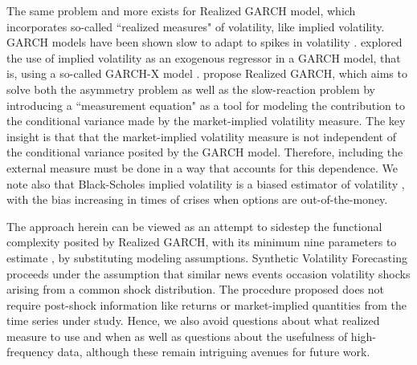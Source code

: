 \documentclass[11pt]{article}
\theoremstyle{definition}
\begin{document}
The same problem and more exists for Realized GARCH model, which incorporates so-called ``realized measures" of volatility, like implied volatility.  GARCH models have been shown slow to adapt to spikes in volatility \citep{andersen2003modeling}.  \citet{engle2002new} explored the use of implied volatility as an exogenous regressor in a GARCH model, that is, using a so-called GARCH-X model \citep{RePEc:pra:mprapa:100301}. \citet{hansen2012realized} propose Realized GARCH, which aims to solve both the asymmetry problem as well as the slow-reaction problem by introducing a ``measurement equation" as a tool for modeling the contribution to the conditional variance made by the market-implied volatility measure.  The key insight is that that the market-implied volatility measure is not independent of the conditional variance posited by the GARCH model.  Therefore, including the external measure must be done in a way that accounts for this dependence.  We note also that Black-Scholes implied volatility is a biased estimator of volatility \citep{mayhew1995implied, christensen1998relation}, with the bias increasing in times of crises when options are out-of-the-money. 

The approach herein can be viewed as an attempt to sidestep the functional complexity posited by Realized GARCH, with its minimum nine parameters to estimate \citep{sharma2016forecasting}, by substituting modeling assumptions.  Synthetic Volatility Forecasting proceeds under the assumption that similar news events occasion volatility shocks arising from a common shock distribution.  The procedure proposed does not require post-shock information like returns or market-implied quantities from the time series under study.  Hence, we also avoid questions about what realized measure to use and when as well as questions about the usefulness of high-frequency data, although these remain intriguing avenues for future work.
\end{document}
